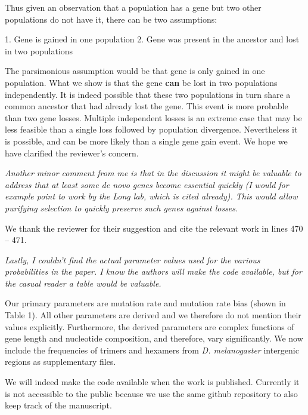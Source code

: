 \documentclass[12pt,a4paper]{article}
\begin{document}
Thus given an observation that a population has a gene but two other populations do not have it, there can be two assumptions:

1. Gene is gained in one population
2. Gene was present in the ancestor and lost in two populations

The parsimonious assumption would be that gene is only gained in one population. What we show is that the gene \textbf{can} be lost in two populations independently. It is indeed possible that these two populations in turn share a common ancestor that had already lost the gene. This event is more probable than two gene losses. Multiple independent losses is an extreme case that may be less feasible than a single loss followed by population divergence. Nevertheless it is possible, and can be more likely than a single gene gain event. We hope we have clarified the reviewer's concern.

{\itshape Another minor comment from me is that in the discussion it might be valuable to address that at least some de novo genes become essential quickly (I would for example point to work by the Long lab, which is cited already). This would allow purifying selection to quickly preserve such genes against losses.}

We thank the reviewer for their suggestion and cite the relevant work in lines 470 -- 471.

{\itshape Lastly, I couldn't find the actual parameter values used for the various probabilities in the paper. I know the authors will make the code available, but for the casual reader a table would be valuable.}

Our primary parameters are mutation rate and mutation rate bias (shown in Table 1). All other parameters are derived and we therefore do not mention their values explicitly. Furthermore, the derived parameters are complex functions of gene length and nucleotide composition, and therefore, vary significantly. We now include the frequencies of trimers and hexamers from \textit{D. melanogaster} intergenic regions as supplementary files. 

We will indeed make the code available when the work is published. Currently it is not accessible to the public because we use the same github repository to also keep track of the manuscript. 
\end{document}
